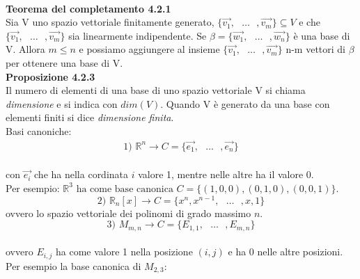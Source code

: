 \documentclass{article}
\begin{document}
\textbf{\\ Teorema del completamento 4.2.1}
\\Sia V uno spazio vettoriale finitamente generato, $\{\vec{v_1},\text{ }\dots\text{ },\vec{v_m}\} \subseteq V$ e che $\{\vec{v_1},\text{ }\dots\text{ },\vec{v_m}\}$ sia linearmente indipendente. Se $\beta=\{\vec{w_1},\text{ }\dots\text{ },\vec{w_n}\}$ è una base di V. Allora $m \leq n$ e possiamo aggiungere al insieme $\{\vec{v_1},\text{ }\dots\text{ },\vec{v_m}\}$ n-m vettori di $\beta$ per ottenere una base di V.
\vspace{8px}
\textbf{\\Proposizione 4.2.3}
\\Il numero di elementi di una base di uno spazio vettoriale V si chiama \textit{dimensione} e si indica con $dim(V)$. Quando V è generato da una base con elementi finiti si dice \textit{dimensione finita}.
\vspace{2px}\\Basi canoniche:
\begin{align*}
  \text{1) }\mathbb{R}^n \to C =\{\vec{e_1},\text{ }\dots\text{ },\vec{e_n}\} 
\end{align*}
\\con $\vec{e_i}$ che ha nella cordinata $i$ valore 1, mentre nelle altre ha il valore 0.
\\Per esempio: $\mathbb{R}^3 \text{ ha come base canonica } C=\{(1,0,0),(0,1,0),(0,0,1)\}$.
\begin{equation*}
  \text{2) }\mathbb{R}_n[x] \to C=\{x^n,x^{n-1},\text{ }\dots\text{ },x,1\}
\end{equation*}
ovvero lo spazio vettoriale dei polinomi di grado massimo $n$.
\begin{equation*}
  \text{3) }M_{m,n} \to C=\{E_{1,1},\text{ }\dots\text{ },E_{m,n}\}
\end{equation*}
\\ovvero $E_{i,j}$ ha come valore 1 nella posizione $(i,j)$ e ha 0 nelle altre posizioni.
\\Per esempio la base canonica di $M_{2,3}$:
\end{document}
